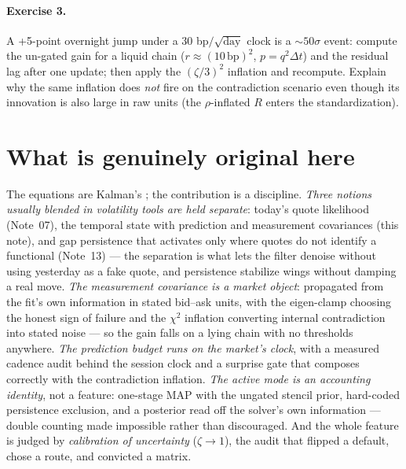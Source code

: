 \documentclass[11pt]{article}
\begin{document}
\paragraph{Exercise 3.}
A +5-point overnight jump under a $30$ bp$/\sqrt{\text{day}}$ clock is
a ${\sim}50\sigma$ event: compute the un-gated gain for a liquid chain
($r\approx(10\,\text{bp})^2$, $p=q^2\Delta t$) and the residual lag
after one update; then apply the $(\zeta/3)^2$ inflation and recompute.
Explain why the same inflation does \emph{not} fire on the
contradiction scenario even though its innovation is also large in raw
units (the $\rho$-inflated $R$ enters the standardization).

\section{What is genuinely original here}
\label{sec:original}

The equations are Kalman's \cite{Kalman1960,AndersonMoore1979}; the
contribution is a discipline.  \emph{Three notions usually blended in
volatility tools are held separate}: today's quote likelihood
(Note~07), the temporal state with prediction and measurement
covariances (this note), and gap persistence that activates only where
quotes do not identify a functional (Note~13) --- the separation is
what lets the filter denoise without using yesterday as a fake quote,
and persistence stabilize wings without damping a real move.  \emph{The
measurement covariance is a market object}: propagated from the fit's
own information in stated bid--ask units, with the eigen-clamp choosing
the honest sign of failure and the $\chi^2$ inflation converting
internal contradiction into stated noise --- so the gain falls on a
lying chain with no thresholds anywhere.  \emph{The prediction budget
runs on the market's clock}, with a measured cadence audit behind the
session clock and a surprise gate that composes correctly with the
contradiction inflation.  \emph{The active mode is an accounting
identity}, not a feature: one-stage MAP with the ungated stencil prior,
hard-coded persistence exclusion, and a posterior read off the solver's
own information --- double counting made impossible rather than
discouraged.  And the whole feature is judged by \emph{calibration of
uncertainty} ($\zeta\to1$), the audit that flipped a default, chose a
route, and convicted a matrix.

\end{document}
